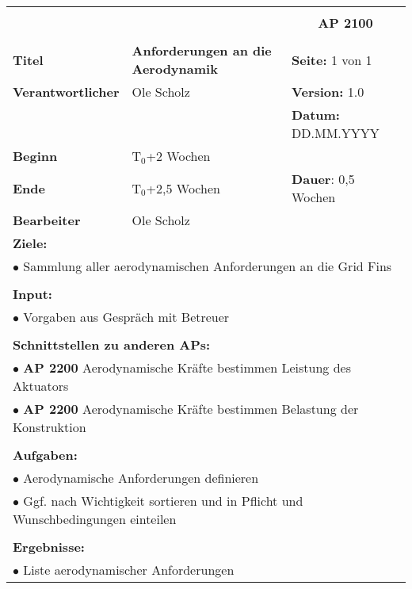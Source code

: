 \clearpage
\begin{table}[!h]
	\begin{center}
		\begin{tabular}{|p{35mm}||p{55mm}|p{50mm}||p{40mm}|}
			\hline
			\multicolumn{3}{|l||}{\textbf{}} & \multicolumn{1}{c|}{}\\
			\multicolumn{3}{|l||}{\textbf{}} & \multicolumn{1}{c|}{\textbf{AP 2100}}\\
			\multicolumn{3}{|l||}{\textbf{}} & \multicolumn{1}{c|}{}\\
			\hline\hline
			\textbf{Titel} & \multicolumn{2}{p{7cm}||}{\textbf{Anforderungen an die Aerodynamik}} 
			& \textbf{Seite:} 1 von 1\\
			\hline
			\textbf{Verantwortlicher} & \multicolumn{2}{l||}{Ole Scholz} & \textbf{Version:} 1.0\\
			\hline
			\multicolumn{3}{|l||}{} & \textbf{Datum:} DD.MM.YYYY\\
			\hline\hline
			\textbf{Beginn} & \multicolumn{2}{l||}{T$_0$+2 Wochen} & \\
			\hline
			\textbf{Ende} & \multicolumn{2}{l||}{T$_0$+2,5 Wochen} & \textbf{Dauer}: 0,5 Wochen\\
			\hline\hline
			\textbf{Bearbeiter} & \multicolumn{3}{l|}{Ole Scholz}\\
			\hline\hline
			\multicolumn{4}{|p{150mm}|}{\textbf{Ziele:}}\\
			\multicolumn{4}{|p{150mm}|}{$\bullet$ Sammlung aller aerodynamischen Anforderungen an die Grid Fins}\\
			\multicolumn{4}{|p{150mm}|}{}\\
			\multicolumn{4}{|p{150mm}|}{\textbf{Input:}}\\
			\multicolumn{4}{|p{150mm}|}{$\bullet$ Vorgaben aus Gespräch mit Betreuer}\\
			\multicolumn{4}{|p{150mm}|}{}\\
			\multicolumn{4}{|p{150mm}|}{\textbf{Schnittstellen zu anderen APs:}}\\
			\multicolumn{4}{|p{150mm}|}{$\bullet$ \textbf{AP 2200} Aerodynamische Kräfte bestimmen Leistung des Aktuators}\\
			\multicolumn{4}{|p{150mm}|}{$\bullet$ \textbf{AP 2200} Aerodynamische Kräfte bestimmen Belastung der Konstruktion}\\
			\multicolumn{4}{|p{150mm}|}{}\\
			\multicolumn{4}{|p{150mm}|}{\textbf{Aufgaben:}}\\
			\multicolumn{4}{|p{150mm}|}{$\bullet$ Aerodynamische Anforderungen definieren}\\
			\multicolumn{4}{|p{150mm}|}{$\bullet$ Ggf. nach Wichtigkeit sortieren und in Pflicht und Wunschbedingungen einteilen}\\
			\multicolumn{4}{|p{150mm}|}{}\\
			\multicolumn{4}{|p{150mm}|}{\textbf{Ergebnisse:}}\\
			\multicolumn{4}{|p{150mm}|}{$\bullet$ Liste aerodynamischer Anforderungen}\\
			\hline
		\end{tabular}
	\end{center}
\end{table}

